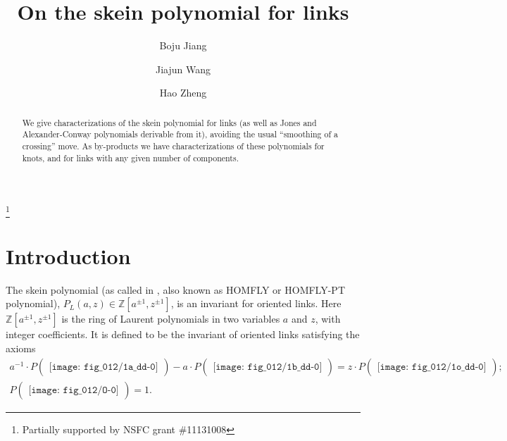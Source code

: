 \documentclass[12pt]{amsart}
\theoremstyle{definition}
\theoremstyle{remark}
\begin{document}
\title     {
                On the skein polynomial for links
           }
\author    {
                             Boju Jiang
           }
\author    {
                             Jiajun Wang
           }
\author    {
                             Hao Zheng
           }
\address   {
                      Department of Mathematics\\
                      Peking University\\
                      Beijing  100871\\
                      China
           }
\thanks    {Partially supported by NSFC grant \#11131008}



\date{}

\begin{abstract}
We give characterizations of the skein polynomial for links
(as well as Jones and Alexander-Conway polynomials derivable from it),
avoiding the usual ``smoothing of a crossing'' move.
As by-products we have characterizations of these polynomials for knots,
and for links with any given number of components.
\end{abstract}

\maketitle

\section {Introduction}
\label{sec:Intro}

The skein polynomial (as called in \cite[Chapter 8]{K1},
also known as HOMFLY or HOMFLY-PT polynomial),
$P_L(a,z) \in \mathbb Z[a^{\pm1},z^{\pm1}]$, is an invariant for oriented links.
Here $\mathbb Z[a^{\pm1},z^{\pm1}]$ is the ring of Laurent polynomials in two variables $a$ and $z$, with integer coefficients.
It is defined to be the invariant of oriented links satisfying the axioms
\begin{gather*}
a^{-1}\cdot P
\begin{pmatrix}
\texttt{[image: fig\_012/1a\_dd-0]}
\end{pmatrix}
-a\cdot P
\begin{pmatrix}
\texttt{[image: fig\_012/1b\_dd-0]}
\end{pmatrix}
=z\cdot P
\begin{pmatrix}
\texttt{[image: fig\_012/1o\_dd-0]}
\end{pmatrix} ;
\tag*{\rm(I)}
\\
P
\begin{pmatrix}
\texttt{[image: fig\_012/O-0]}
\end{pmatrix}
=1 .
\tag*{\rm(O)}
\end{gather*}
\end{document}

